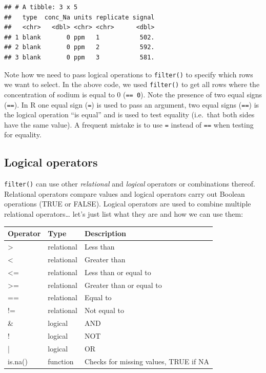 \documentclass[
]{book}
\begin{document}
\begin{verbatim}
## # A tibble: 3 x 5
##   type  conc_Na units replicate signal
##   <chr>   <dbl> <chr> <chr>      <dbl>
## 1 blank       0 ppm   1           502.
## 2 blank       0 ppm   2           592.
## 3 blank       0 ppm   3           581.
\end{verbatim}

Note how we need to pass logical operations to \texttt{filter()} to specify which rows we want to select. In the above code, we used \texttt{filter()} to get all rows where the concentration of sodium is equal to 0 (\texttt{==\ 0}). Note the presence of two equal signs (\texttt{==}). In R one equal sign (\texttt{=}) is used to pass an argument, two equal signs (\texttt{==}) is the logical operation ``is equal'' and is used to test equality (i.e.~that both sides have the same value). A frequent mistake is to use \texttt{=} instead of \texttt{==} when testing for equality.

\hypertarget{logical-operators}{%
\subsection{Logical operators}\label{logical-operators}}

\texttt{filter()} can use other \emph{relational} and \emph{logical} operators or combinations thereof. Relational operators compare values and logical operators carry out Boolean operations (TRUE or FALSE). Logical operators are used to combine multiple relational operators\ldots{} let's just list what they are and how we can use them:

\begin{tabular}{l|l|l}
\hline
Operator & Type & Description\\
\hline
> & relational & Less than\\
\hline
< & relational & Greater than\\
\hline
<= & relational & Less than or equal to\\
\hline
>= & relational & Greater than or equal to\\
\hline
== & relational & Equal to\\
\hline
!= & relational & Not equal to\\
\hline
\& & logical & AND\\
\hline
! & logical & NOT\\
\hline
| & logical & OR\\
\hline
is.na() & function & Checks for missing values, TRUE if NA\\
\hline
\end{tabular}
\end{document}
